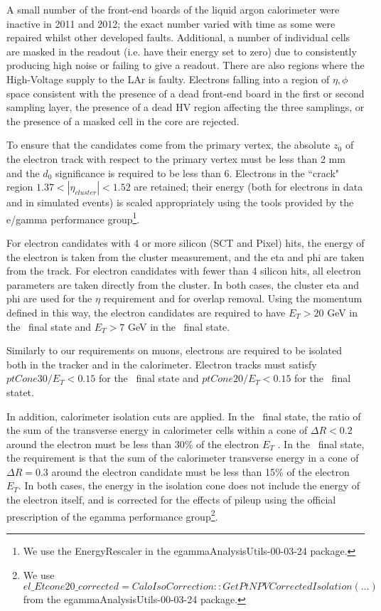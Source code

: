 A small number of the front-end boards of the liquid argon calorimeter were
inactive in 2011 and 2012; the exact number varied with time as some were
repaired whilst other developed faults. Additional, a number of individual cells
are masked in the readout (i.e. have their energy set to zero) due to
consistently producing high noise or failing to give a readout. There are also
regions where the High-Voltage supply to the LAr is faulty. Electrons falling into a region of
$\eta, \phi$ space consistent with the presence of a dead front-end board in
the first or second sampling layer, the presence of a dead HV region affecting the
three samplings, or the presence of a masked cell in the core are rejected.

To ensure that the candidates come from
the primary vertex, the absolute $z_0$ of the electron track with respect to the primary
vertex must be less than 2 mm and the $d_0$ significance is required to be
less than 6.
Electrons in the ``crack" region $1.37 < |\eta_{cluster}| < 1.52$ are retained; 
their energy (both for electrons in data and in simulated events) is scaled 
appropriately using the tools provided by the e/gamma 
performance group\footnote{We use the EnergyRescaler in the egammaAnalysisUtils-00-03-24 package.}.

For electron candidates with 4 or more silicon (SCT and Pixel) hits, the energy of
the electron is taken from the cluster measurement, and the eta and phi
are taken from the track. For electron candidates with fewer than 4
silicon hits, all electron parameters are taken directly from the
cluster. In both cases, the cluster eta and phi are used for the $\eta$
requirement and for overlap removal. Using the momentum defined in this way, the electron
candidates are required to have $E_T > 20$ GeV in the \llvv\ final state and
$E_T > 7$ GeV in the \llll\ final state. 

Similarly to our requirements on muons, electrons are required to be isolated both in the tracker and in the calorimeter.
Electron tracks must satisfy $ptCone30/E_{T}<0.15$ for the \llvv\ final state
and $ptCone20/E_{T}<0.15$ for the \llll\ final statet. 

In addition, calorimeter isolation cuts are applied. In the \llll\ final state, the ratio of the sum of the transverse energy in calorimeter cells 
within a cone of $\Delta R < 0.2$ around the electron 
 must be less than 30\% of the electron $E_T$ .
In the \llvv\ final state, the requirement is that the sum of the calorimeter transverse energy in
a cone of $\Delta R = 0.3$ around the electron candidate must be less than
15\% of the electron $E_{T}$.
In both cases, the energy in the isolation cone does not include the energy of
the electron itself, and is corrected for the
effects of pileup using the official prescription of the 
egamma performance group\footnote{We use $el\_Etcone20\_corrected = CaloIsoCorrection::GetPtNPVCorrectedIsolation(\ldots)$ from the egammaAnalysisUtils-00-03-24 package.}.

